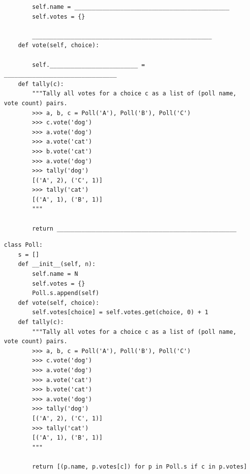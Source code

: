 \documentclass{exam}
\newlength{\currentparskip}
\newenvironment{blocksection}
{
    \setlength{\currentparskip}{\parskip}%
    \begin{minipage}{\linewidth}
    \setlength{\parskip}{\currentparskip}%
}
{
    \end{minipage}
}
\begin{document}
\begin{questions}
\begin{blocksection}
\begin{lstlisting}
        self.name = ____________________________________________
        self.votes = {}

        ___________________________________________________
    def vote(self, choice):

        self._________________________ = ________________________________
    def tally(c):
        """Tally all votes for a choice c as a list of (poll name, vote count) pairs.
        >>> a, b, c = Poll('A'), Poll('B'), Poll('C')
        >>> c.vote('dog')
        >>> a.vote('dog')
        >>> a.vote('cat')
        >>> b.vote('cat')
        >>> a.vote('dog')
        >>> tally('dog')
        [('A', 2), ('C', 1)]
        >>> tally('cat')
        [('A', 1), ('B', 1)]
        """
        
        return ___________________________________________________        
\end{lstlisting}
\end{blocksection}
\begin{solution}
    \begin{lstlisting}
class Poll:
    s = []
    def __init__(self, n):
        self.name = N
        self.votes = {}
        Poll.s.append(self)
    def vote(self, choice):
        self.votes[choice] = self.votes.get(choice, 0) + 1
    def tally(c):
        """Tally all votes for a choice c as a list of (poll name, vote count) pairs.
        >>> a, b, c = Poll('A'), Poll('B'), Poll('C')
        >>> c.vote('dog')
        >>> a.vote('dog')
        >>> a.vote('cat')
        >>> b.vote('cat')
        >>> a.vote('dog')
        >>> tally('dog')
        [('A', 2), ('C', 1)]
        >>> tally('cat')
        [('A', 1), ('B', 1)]
        """
        
        return [(p.name, p.votes[c]) for p in Poll.s if c in p.votes]
\end{lstlisting}
\end{solution}
\end{questions}
\end{document}
